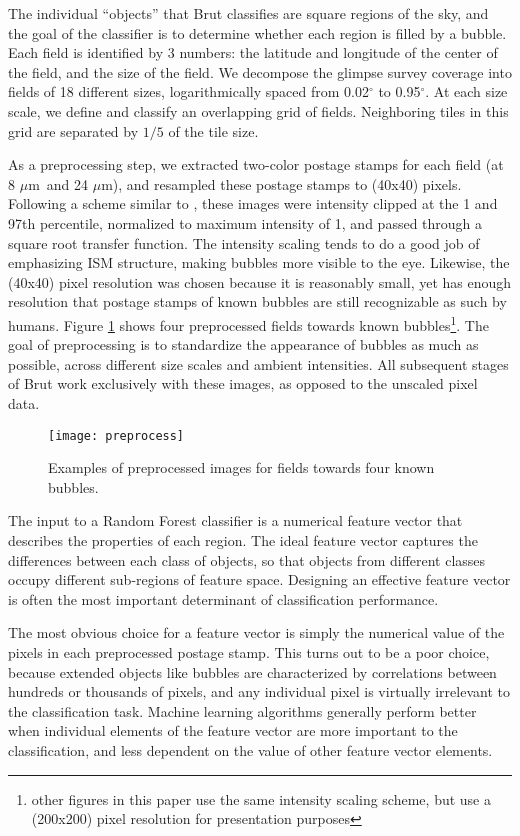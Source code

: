 \documentclass[preprint]{aastex}
\newcommand{\um}[0]{$\mu$m}
\begin{document}
The individual ``objects'' that Brut classifies are square regions of the sky, and the goal of the classifier is to determine whether each region is filled by a bubble. Each field is identified by 3 numbers: the latitude and longitude of the center of the field, and the size of the field. We decompose the {\sc glimpse} survey coverage into fields of 18 different sizes, logarithmically spaced from 0.02$^\circ$ to 0.95$^\circ$. At each size scale, we define and classify an overlapping grid of fields. Neighboring tiles in this grid are separated by $1/5$ of the tile size.

As a preprocessing step, we extracted two-color postage stamps for each field (at 8 \um\, and 24 \um), and resampled these postage stamps to (40x40) pixels. Following a scheme similar to \cite{Simpson12}, these images were intensity clipped at the 1 and 97th percentile, normalized to maximum intensity of 1, and passed through a square root transfer function. The intensity scaling tends to do a good job of emphasizing ISM structure, making bubbles more visible to the eye. Likewise, the (40x40) pixel resolution was chosen because it is reasonably small, yet has enough resolution that postage stamps of known bubbles are still recognizable as such by humans.  Figure \ref{fig:preprocess} shows four preprocessed fields towards known bubbles\footnote{other figures in this paper use the same intensity scaling scheme, but use a (200x200) pixel resolution for presentation purposes}. The goal of preprocessing is to standardize the appearance of bubbles as much as possible, across different size scales and ambient intensities. All subsequent stages of Brut work exclusively with these images, as opposed to the unscaled pixel data.

\begin{figure}[h!]
\texttt{[image: preprocess]}
\caption{Examples of preprocessed images for fields towards four known bubbles.}
\label{fig:preprocess}
\end{figure}

The input to a Random Forest classifier is a numerical feature vector that describes the properties of each region. The ideal feature vector captures the differences between each class of objects, so that objects from different classes occupy different sub-regions of feature space. Designing an effective feature vector is often the most important determinant of classification performance.

The most obvious choice for a feature vector is simply the numerical value of the pixels in each preprocessed postage stamp. This turns out to be a poor choice, because extended objects like bubbles are characterized by correlations between hundreds or thousands of pixels, and any individual pixel is virtually irrelevant to the classification task. Machine learning algorithms generally perform better when individual elements of the feature vector are more important to the classification, and less dependent on the value of other feature vector elements.
\end{document}
